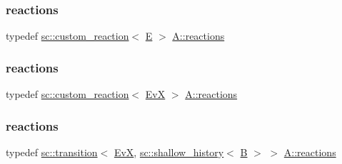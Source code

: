 \mbox{\label{struct_a_a34ec5dc41104a605ae13eff9a6a97a39}} 
\subsubsection{\texorpdfstring{reactions}{reactions}\hspace{0.1cm}{\footnotesize\ttfamily [2/13]}}
{\footnotesize\ttfamily typedef \mbox{\hyperlink{classboost_1_1statechart_1_1custom__reaction}{sc\+::custom\+\_\+reaction}}$<$ \mbox{\hyperlink{struct_e}{E}} $>$ \mbox{\hyperlink{struct_a_aaf7ef039e669b21e19f81777afeed659}{A\+::reactions}}}

\mbox{\label{struct_a_aca29ac82093be1c88d8177f5108af763}} 
\subsubsection{\texorpdfstring{reactions}{reactions}\hspace{0.1cm}{\footnotesize\ttfamily [3/13]}}
{\footnotesize\ttfamily typedef \mbox{\hyperlink{classboost_1_1statechart_1_1custom__reaction}{sc\+::custom\+\_\+reaction}}$<$ \mbox{\hyperlink{struct_ev_x}{EvX}} $>$ \mbox{\hyperlink{struct_a_aaf7ef039e669b21e19f81777afeed659}{A\+::reactions}}}

\mbox{\label{struct_a_aaea4dcd074640c12d239e2c4fd846adc}} 
\subsubsection{\texorpdfstring{reactions}{reactions}\hspace{0.1cm}{\footnotesize\ttfamily [4/13]}}
{\footnotesize\ttfamily typedef \mbox{\hyperlink{classboost_1_1statechart_1_1transition}{sc\+::transition}}$<$ \mbox{\hyperlink{struct_ev_x}{EvX}}, \mbox{\hyperlink{classboost_1_1statechart_1_1shallow__history}{sc\+::shallow\+\_\+history}}$<$ \mbox{\hyperlink{struct_b}{B}} $>$ $>$ \mbox{\hyperlink{struct_a_aaf7ef039e669b21e19f81777afeed659}{A\+::reactions}}}

\mbox{\label{struct_a_a34ec5dc41104a605ae13eff9a6a97a39}} 
